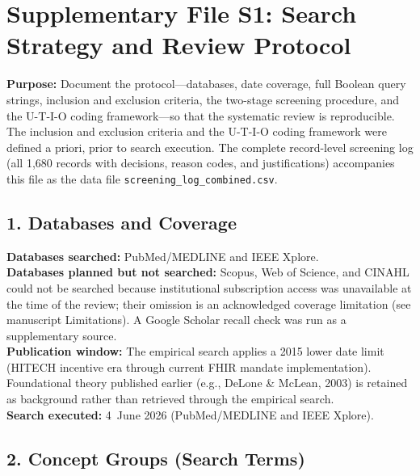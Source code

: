 
\newpage
\section*{Supplementary File S1: Search Strategy and Review Protocol}
\label{sec:S1}

\noindent\textbf{Purpose:} Document the protocol---databases, date coverage, full
Boolean query strings, inclusion and exclusion criteria, the two-stage screening
procedure, and the U-T-I-O coding framework---so that the systematic review is
reproducible. The inclusion and exclusion criteria and the U-T-I-O coding
framework were defined a priori, prior to search execution. The complete
record-level screening log (all 1{,}680 records with decisions, reason codes, and
justifications) accompanies this file as the data file
\texttt{screening\_log\_combined.csv}.

\subsection*{1. Databases and Coverage}

\noindent\textbf{Databases searched:} PubMed/MEDLINE and IEEE Xplore. \\
\textbf{Databases planned but not searched:} Scopus, Web of Science, and CINAHL
could not be searched because institutional subscription access was unavailable
at the time of the review; their omission is an acknowledged coverage limitation
(see manuscript Limitations). A Google Scholar recall check was run as a
supplementary source. \\
\textbf{Publication window:} The empirical search applies a 2015 lower date limit
(HITECH incentive era through current FHIR mandate implementation). Foundational
theory published earlier (e.g., DeLone \& McLean, 2003) is retained as background
rather than retrieved through the empirical search. \\
\textbf{Search executed:} 4~June 2026 (PubMed/MEDLINE and IEEE Xplore).

\subsection*{2. Concept Groups (Search Terms)}

